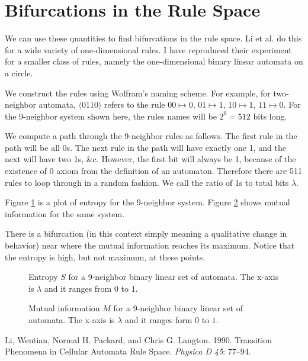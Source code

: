 \documentclass[12pt]{article}
\begin{document}
\section{Bifurcations in the Rule Space}

We can use these quantities to find bifurcations in the rule space.  Li
et al. \cite{Li-1990} do this for a wide variety of one-dimensional
rules.  I have reproduced their experiment for a smaller class of rules,
namely the one-dimensional binary linear automata on a circle.  

We construct the rules using Wolfram's naming scheme.  For example, for
two-neighbor automata, $\langle 0110 \rangle$ refers to the rule $00
\mapsto 0$, $01 \mapsto 1$, $10 \mapsto 1$, $11 \mapsto 0$.   For the
9-neighbor system shown here, the rules names will be $2^9 = 512$ bits
long.

We compute a path through the 9-neighbor rules as follows.  The first
rule in the path will be all 0s.  The next rule in the path will have
exactly one 1, and the next will have two 1s, \&c.  However, the first
bit will always be 1, because of the existence of 0 axiom from the
definition of an automaton.  Therefore there are 511 rules to loop
through in a random fashion.  We call the ratio of 1s to total bits
$\lambda$.

Figure \ref{entropy-9} is a plot of entropy for the 9-neighbor system.
Figure \ref{mutual-9} shows mutual information for the same system.

There is a bifurcation (in this context simply meaning a qualitative
change in behavior) near where the mutual information reaches its
maximum.  Notice that the entropy is high, but not maximum, at these
points.

\begin{figure}
\caption{Entropy $S$ for a 9-neighbor binary linear set of automata.  The
x-axis is $\lambda$ and it ranges from $0$ to $1$.}
\label{entropy-9}
\end{figure}

\begin{figure}
\caption{Mutual information $M$ for a 9-neighbor binary linear set of
automata.  The x-axis is $\lambda$ and it ranges form $0$ to $1$.}
\label{mutual-9}
\end{figure}

\begin{thebibliography}{4in}
 Li, Wentian, Normal H. Packard, and Chris G. Langton.
1990.  Transition Phenomena in Cellular Automata Rule Space.
\textit{Physica D 45}: 77--94.
\end{thebibliography}
\end{document}
